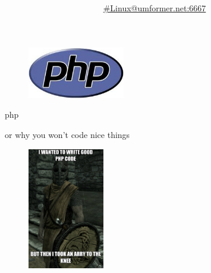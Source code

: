 \documentclass[final]{beamer}
\author{\href{http://chat.mibbit.com/?channel=\%23linux\&nick=your_nick_here\&server=umformer.net\&autoConnect=true}{\#Linux@umformer.net:6667}}
\title{ }
\begin{document}
\begin{frame}
\begin{center}
\vspace{1em}
\vspace{0.4em}
\begin{figure}[ht]
  \centering
	\includegraphics[width=160px]{./../graph/other/php.jpg}
\end{figure}
\vspace{0.4em}
\vspace{1em}
\end{center}
\end{frame}

\begin{frame}{php}
\begin{center}
\vspace{1em}
\vspace{0.4em}
\centering or why you won't code nice things
\vspace{0.4em}
\vspace{1em}
\end{center}
\end{frame}

\begin{frame}
\begin{center}
\begin{figure}[ht]
  \centering
	\includegraphics[height=200px]{./../graph/Meme/arraytotheknee.jpg}
\end{figure}
\end{center}
\end{frame}
\end{document}
